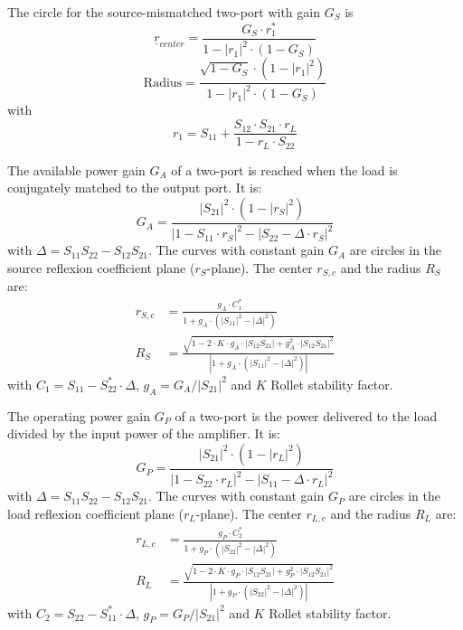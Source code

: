 The circle for the source-mismatched two-port with gain $G_S$ is
\begin{equation}
\underline{r}_{center} = \frac{G_S\cdot r_1^*}{1 - |r_1|^2\cdot (1-G_S)}
\end{equation}
\begin{equation}
\text{Radius} =
   \frac{\sqrt{1 - G_S}\cdot (1-|r_1|^2)}{1 - |r_1|^2\cdot (1-G_S)}
\end{equation}
with
\begin{equation}
r_1 = S_{11} + \frac{S_{12}\cdot S_{21}\cdot r_L}{1 - r_L\cdot S_{22}}
\end{equation}

\addvspace{12pt}

The available power gain $G_A$ of a two-port is reached when the load is
conjugately matched to the output port. It is:
\begin{equation}
G_A = \frac{|S_{21}|^2\cdot (1-|r_S|^2)}{|1-S_{11}\cdot r_S|^2 - |S_{22}-\Delta\cdot r_S|^2}
\end{equation}
with $\Delta = S_{11}S_{22} - S_{12}S_{21}$. The curves with constant
gain $G_A$ are circles in the source reflexion coefficient plane ($r_S$-plane).
The center $r_{S,c}$ and the radius $R_S$ are:
\begin{align}
r_{S,c} & = \frac{g_A\cdot C_1^*}{1 + g_A\cdot(|S_{11}|^2 - |\Delta|^2)} \\
R_S     & = \frac{\sqrt{1 - 2\cdot K\cdot g_A\cdot|S_{12}S_{21}| + g_A^2\cdot|S_{12}S_{21}|^2}}
                 {|1 + g_A\cdot(|S_{11}|^2 - |\Delta|^2)|}
\end{align}
with $C_1 = S_{11} - S_{22}^*\cdot\Delta$, $g_A = G_A / |S_{21}|^2$ and $K$ Rollet stability factor.

\addvspace{12pt}

The operating power gain $G_P$ of a two-port is the power delivered
to the load divided by the input power of the amplifier. It is:
\begin{equation}
G_P = \frac{|S_{21}|^2\cdot (1-|r_L|^2)}{|1-S_{22}\cdot r_L|^2 - |S_{11}-\Delta\cdot r_L|^2}
\end{equation}
with $\Delta = S_{11}S_{22} - S_{12}S_{21}$. The curves with constant
gain $G_P$ are circles in the load reflexion coefficient plane ($r_L$-plane).
The center $r_{L,c}$ and the radius $R_L$ are:
\begin{align}
r_{L,c} & = \frac{g_P\cdot C_2^*}{1 + g_P\cdot(|S_{22}|^2 - |\Delta|^2)} \\
R_L     & = \frac{\sqrt{1 - 2\cdot K\cdot g_P\cdot|S_{12}S_{21}| + g_P^2\cdot|S_{12}S_{21}|^2}}
                 {|1 + g_P\cdot(|S_{22}|^2 - |\Delta|^2)|}
\end{align}
with $C_2 = S_{22} - S_{11}^*\cdot\Delta$, $g_P = G_P / |S_{21}|^2$ and $K$ Rollet stability factor.

